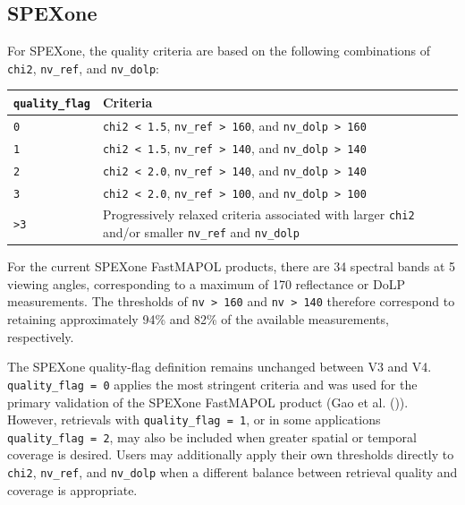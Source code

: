 \documentclass[
  11pt,
  letterpaper,
]{scrreprt}
\begin{document}
\subsection{SPEXone}\label{spexone}

For SPEXone, the quality criteria are based on the following
combinations of \texttt{chi2}, \texttt{nv\_ref}, and \texttt{nv\_dolp}:

\begin{longtable}[]{@{}
  >{\raggedright\arraybackslash}p{}
  >{\raggedright\arraybackslash}p{}@{}}
\toprule\noalign{}
\begin{minipage}[b]{\linewidth}\raggedright
\texttt{quality\_flag}
\end{minipage} & \begin{minipage}[b]{\linewidth}\raggedright
Criteria
\end{minipage} \\
\midrule\noalign{}
\endhead
\bottomrule\noalign{}
\endlastfoot
\texttt{0} & \texttt{chi2\ \textless{}\ 1.5},
\texttt{nv\_ref\ \textgreater{}\ 160}, and
\texttt{nv\_dolp\ \textgreater{}\ 160} \\
\texttt{1} & \texttt{chi2\ \textless{}\ 1.5},
\texttt{nv\_ref\ \textgreater{}\ 140}, and
\texttt{nv\_dolp\ \textgreater{}\ 140} \\
\texttt{2} & \texttt{chi2\ \textless{}\ 2.0},
\texttt{nv\_ref\ \textgreater{}\ 140}, and
\texttt{nv\_dolp\ \textgreater{}\ 140} \\
\texttt{3} & \texttt{chi2\ \textless{}\ 2.0},
\texttt{nv\_ref\ \textgreater{}\ 100}, and
\texttt{nv\_dolp\ \textgreater{}\ 100} \\
\texttt{\textgreater{}3} & Progressively relaxed criteria associated
with larger \texttt{chi2} and/or smaller \texttt{nv\_ref} and
\texttt{nv\_dolp} \\
\end{longtable}

For the current SPEXone FastMAPOL products, there are 34 spectral bands
at 5 viewing angles, corresponding to a maximum of 170 reflectance or
DoLP measurements. The thresholds of \texttt{nv\ \textgreater{}\ 160}
and \texttt{nv\ \textgreater{}\ 140} therefore correspond to retaining
approximately 94\% and 82\% of the available measurements, respectively.

The SPEXone quality-flag definition remains unchanged between V3 and V4.
\texttt{quality\_flag\ =\ 0} applies the most stringent criteria and was
used for the primary validation of the SPEXone FastMAPOL product (Gao et
al. ()). However, retrievals with
\texttt{quality\_flag\ =\ 1}, or in some applications
\texttt{quality\_flag\ =\ 2}, may also be included when greater spatial
or temporal coverage is desired. Users may additionally apply their own
thresholds directly to \texttt{chi2}, \texttt{nv\_ref}, and
\texttt{nv\_dolp} when a different balance between retrieval quality and
coverage is appropriate.
\end{document}
